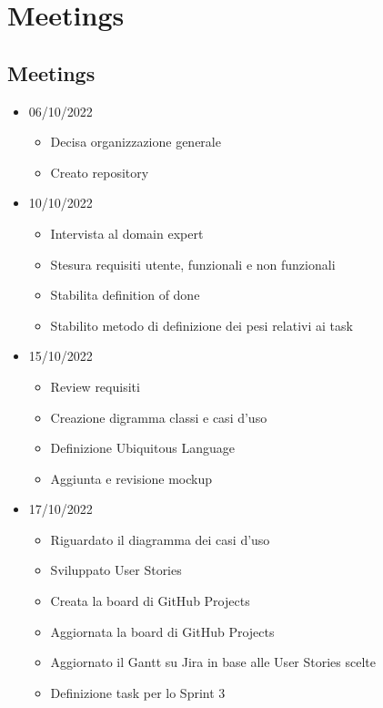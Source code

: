 \chapter{Meetings}

\section{Meetings}
\begin{itemize}
    \item 06/10/2022
        \begin{itemize}
            \item Decisa organizzazione generale
            \item Creato repository
        \end{itemize}
    \item 10/10/2022
        \begin{itemize}
            \item Intervista al domain expert
            \item Stesura requisiti utente, funzionali e non funzionali
            \item Stabilita definition of done
            \item Stabilito metodo di definizione dei pesi relativi ai task
        \end{itemize}
    \item 15/10/2022
        \begin{itemize}
            \item Review requisiti
            \item Creazione digramma classi e casi d'uso
            \item Definizione Ubiquitous Language
            \item Aggiunta e revisione mockup
        \end{itemize}
    \item 17/10/2022
        \begin{itemize}
            \item Riguardato il diagramma dei casi d'uso
            \item Sviluppato User Stories
            \item Creata la board di GitHub Projects
            \item Aggiornata la board di GitHub Projects
            \item Aggiornato il Gantt su Jira in base alle User Stories scelte
            \item Definizione task per lo Sprint 3

\end{itemize}
\end{itemize}
